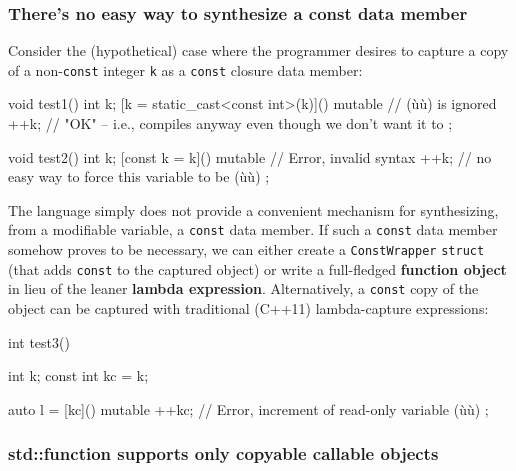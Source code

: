 \subsubsection[There’s no easy way to synthesize a {\ttfamily const} data member]{There’s no easy way to synthesize a {\SubsubsecCode const} data member}\label{there’s-no-easy-way-to-synthesize-a-const-data-member}

Consider the (hypothetical) case where the programmer desires to capture
a copy of a non-\texttt{const} integer \texttt{k} as a \texttt{const}
closure data member:

\begin{emcppslisting}[emcppsstandards={c++14}]
void test1()
{
    int k;
    [k = static_cast<const int>(k)]() mutable  // (ù{}ù) is ignored
    {
        ++k;  // "OK" -- i.e., compiles anyway even though we don't want it to
    };
}
\end{emcppslisting}

\begin{emcppslisting}[emcppsstandards={c++14}]
void test2()
{
    int k;
    [const k = k]() mutable  // Error, invalid syntax
    {
        ++k;  // no easy way to force this variable to be (ù{}ù)
    };
}
\end{emcppslisting}
    
\noindent The language simply does not provide a convenient mechanism for
synthesizing, from a modifiable variable, a \texttt{const} data member.
If such a \texttt{const} data member somehow proves to be necessary, we
can either create a \texttt{ConstWrapper} \texttt{struct} (that adds
\texttt{const} to the captured object) or write a full-fledged
\textbf{function object} in lieu of the leaner \textbf{lambda
expression}. Alternatively, a \texttt{const} copy of the object can be
captured with traditional (C++11) lambda-capture expressions:

\begin{emcppslisting}
int test3()
{
    int k;
    const int kc = k;

    auto l = [kc]() mutable
    {
        ++kc;  // Error, increment of read-only variable (ù{}ù)
    };
}
\end{emcppslisting}
    

\subsubsection[{\ttfamily std::function} supports only copyable callable objects]{{\SubsubsecCode std::function} supports only copyable callable objects}\label{std::function-supports-only-copyable-callable-objects}

